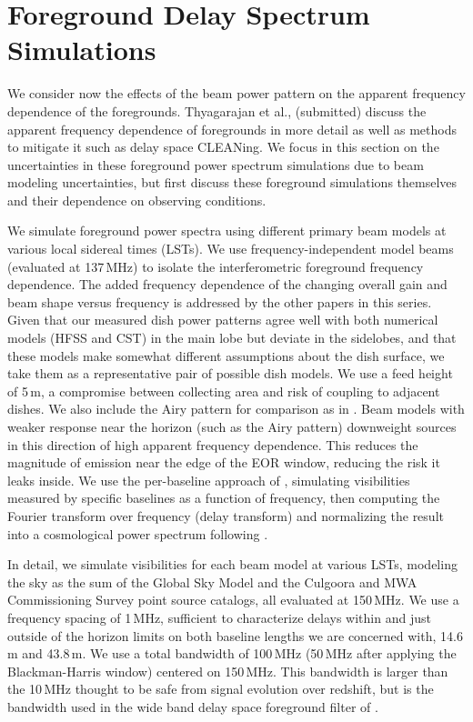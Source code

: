 \documentclass{emulateapj}
\begin{document}
\section{Foreground Delay Spectrum Simulations}
\label{sec:foregrounds}

We consider now the effects of the beam power pattern on the apparent frequency dependence of the foregrounds. Thyagarajan et al., (submitted) discuss the apparent frequency dependence of foregrounds in more detail as well as methods to mitigate it such as delay space CLEANing. We focus in this section on the uncertainties in these foreground power spectrum simulations due to beam modeling uncertainties, but first discuss these foreground simulations themselves and their dependence on observing conditions. 

We simulate foreground power spectra using different primary beam models at various local sidereal times (LSTs). We use frequency-independent model beams (evaluated at 137\,MHz) to isolate the interferometric foreground frequency dependence. The added frequency dependence of the changing overall gain and beam shape versus frequency is addressed by the other papers in this series. Given that our measured dish power patterns agree well with both numerical models (HFSS and CST) in the main lobe but deviate in the sidelobes, and that these models make somewhat different assumptions about the dish surface, we take them as a representative pair of possible dish models. We use a feed height of 5\,m, a compromise between collecting area and risk of coupling to adjacent dishes. We also include the Airy pattern for comparison as in \citet{nithya15}. Beam models with weaker response near the horizon (such as the Airy pattern) downweight sources in this direction of high apparent frequency dependence. This reduces the magnitude of emission near the edge of the EOR window, reducing the risk it leaks inside. We use the per-baseline approach of \citet{parsons12a,parsons12b}, simulating visibilities measured by specific baselines as a function of frequency, then computing the Fourier transform over frequency (delay transform) and normalizing the result into a cosmological power spectrum following \citet{nithya15}. 

In detail, we simulate visibilities for each beam model at various LSTs, modeling the sky as the sum of the Global Sky Model \citep{gsm} and the Culgoora \citep{Slee1995} and MWA Commissioning Survey \citep{MWACS} point source catalogs, all evaluated at 150\,MHz. We use a frequency spacing of 1\,MHz, sufficient to characterize delays within and just outside of the horizon limits on both baseline lengths we are concerned with, 14.6\,m and 43.8\,m. We use a total bandwidth of 100\,MHz (50\,MHz after applying the Blackman-Harris window) centered on 150\,MHz. This bandwidth is larger than the 10\,MHz thought to be safe from signal evolution over redshift, but is the bandwidth used in the wide band delay space foreground filter of \citet{paper32,paper64}.
\end{document}
